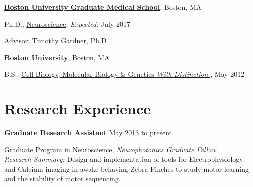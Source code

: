 \href{https://www.bumc.bu.edu/gms/}{\textbf{Boston University Graduate Medical School}},
Boston, MA
\begin{outerlist}
\item[] Ph.D.,
        \href{http://www.bu.edu/neuro/graduate/}
             {Neuroscience},
             \emph{Expected:} July 2017
        \begin{innerlist}
        \item Advisor:
              \href{http://people.bu.edu/timothyg/}
                   {Timothy Gardner, Ph.D} 
        \end{innerlist}
\end{outerlist}
\vspace{.1in}
\href{http://www.bu.edu}{\textbf{Boston University}},
Boston, MA
\begin{outerlist}
\item[] B.S.,
        \href{http://www.bu.edu/academics/cas/programs/biochemistry-molecular-biology/ba-ma/}
             {Cell Biology, Molecular Biology  \& Genetics  \textit{With Distinction}
}, May 2012
\end{outerlist}

\section{Research Experience}

\textbf{Graduate Research Assistant} \hfill {May 2013 to present}
\begin{innerlist}

\item[] Graduate Program in Neuroscience,  \emph{Neurophotonics Graduate Fellow}\\
        \textit{Research Summary:}  Design and implementation of tools for Electrophysiology and Calcium imaging in awake behaving Zebra Finches to study motor learning and the stability of motor sequencing.
\end{innerlist}




